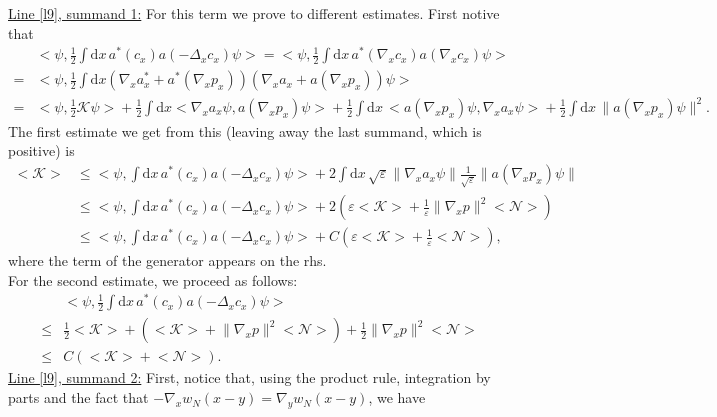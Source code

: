 \documentclass[11pt,a4paper]{scrartcl}
\newcommand{\di}{\textrm{d}}		%
\newcommand{\Ncal}{\mathcal{N}}		%
\newcommand{\Kcal}{\mathcal{K}}		%
\newcommand{\estlist}[2]{\underline{Line \ref{l#1}, summand #2:}}
\newcommand{\scal}[2]{\big<#1,#2\big>} %
\newcommand{\norm}[1]{\lVert#1\rVert}	%
\newcommand{\ev}[1]{\big<#1\big>}	%
\begin{document}
\estlist{9}{1}
For this term we prove to different estimates. First notive that
\begin{align*}
 & \scal{\psi}{\frac{1}{2}\int \di x\, a^\ast(c_x) a(-\Delta_x c_x)\psi} = \scal{\psi}{\frac{1}{2}\int \di x\, a^\ast(\nabla_x c_x)a(\nabla_x c_x)\psi} \\
= & \scal{\psi}{\frac{1}{2}\int \di x \left( \nabla_x a^\ast_x + a^\ast(\nabla_x p_x) \right)\left(  \nabla_x a_x + a(\nabla_x p_x) \right) \psi} \\
= & \scal{\psi}{\frac{1}{2}\Kcal \psi} + \frac{1}{2}\int \di x\scal{\nabla_x a_x \psi}{a(\nabla_x p_x)\psi} + \frac{1}{2}\int \di x\, \scal{a(\nabla_x p_x)\psi}{\nabla_x a_x \psi} + \frac{1}{2}\int \di x\, \norm{a(\nabla_x p_x)\psi}^2.
\end{align*}
The first estimate we get from this (leaving away the last summand, which is positive) is
\begin{equation}
\tag{A}
\label{eq:bound1A}
\begin{split}
 \ev{\Kcal} & \leq \scal{\psi}{\int \di x\, a^\ast(c_x) a(-\Delta_x c_x)\psi} + 2\int \di x\, \sqrt{\varepsilon} \norm{\nabla_x a_x \psi} \frac{1}{\sqrt{\varepsilon}} \norm{a(\nabla_x p_x)\psi} \\
& \leq \scal{\psi}{\int \di x\, a^\ast(c_x) a(-\Delta_x c_x)\psi} + 2\left( \varepsilon \ev{\Kcal} + \frac{1}{\varepsilon}  \norm{\nabla_x p}^2 \ev{\Ncal}\right) \\
& \leq \scal{\psi}{\int \di x\,a^\ast(c_x) a(-\Delta_x c_x)\psi} + C\left( \varepsilon \ev{\Kcal} + \frac{1}{\varepsilon}\ev{\Ncal} \right),
\end{split}
\end{equation}
where the term of the generator appears on the rhs.\\
For the second estimate, we proceed as follows:
\begin{equation}
\tag{B}
\label{eq:bound1B}
\begin{split}
 & \scal{\psi}{\frac{1}{2} \int \di x\, a^\ast(c_x) a(-\Delta_x c_x)\psi} \\
\leq & \frac{1}{2}\ev{\Kcal} + \left( \ev{\Kcal} + \norm{\nabla_x p}^2 \ev{\Ncal}\right) + \frac{1}{2}\norm{\nabla_x p}^2 \ev{\Ncal} \\
\leq & C\left( \ev{\Kcal} + \ev{\Ncal} \right).
\end{split}
\end{equation}
\estlist{9}{2}
First, notice that, using the product rule, integration by parts and the fact that $-\nabla_x w_N(x-y) = \nabla_y w_N(x-y)$, we have
\end{document}
